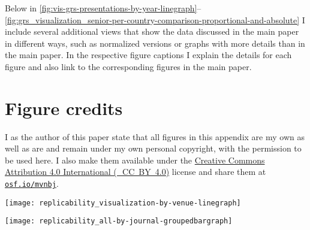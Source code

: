 \documentclass[conference,svgnames]{vgtc}                     %
\newcommand{\ie}{i.\,e.}
\newcommand{\osfid}{mvnbj}
\begin{document}
Below in \autoref{fig:vis-grs-presentations-by-year-linegraph}--\ref{fig:grs_visualization_senior-per-country-comparison-proportional-and-absolute} I include several additional views that show the data discussed in the main paper in different ways, such as normalized versions or graphs with more details than in the main paper. In the respective figure captions I explain the details for each figure and also link to the corresponding figures in the main paper.

\section*{Figure credits}
\label{sec:figure_credits_appx}

I as the author of this paper state that all figures in this appendix are my own as well as are and remain under my own personal copyright, with the permission to be used here. I also make them available under the \href{https://creativecommons.org/licenses/by/4.0/}{Creative Commons At\-tri\-bu\-tion 4.0 International (\ccLogo\,\ccAttribution\ \mbox{CC BY 4.0})} license and share them at \href{https://osf.io/\osfid/}{\texttt{osf.io/\osfid}}.

\begin{figure*}
	\centering
	\texttt{[image: replicability\_visualization-by-venue-linegraph]}
	\caption{Line graph version of \autoref{fig:teaser} (but without the stacking aspect of \autoref{fig:teaser}, so here I show one line for only the GRSI-awarded papers of the venue plus one line for all papers of a venue): Papers that can clearly be classified as visualization work (visualization conferences and special issues in journals) by \emph{presentation} year (\ie, based on the \emph{conference years}, in which the papers were presented) and their subset with GRS.\textsuperscript{\ref{foot:vis_presentations},\ref{foot:c-and-g-special}}}
	\label{fig:vis-grs-presentations-by-year-linegraph}
\end{figure*}

\begin{figure*}
	\centering
	\texttt{[image: replicability\_all-by-journal-groupedbargraph]}
	\caption{Bar chart version of \autoref{fig:grs-overall}: Overall development of papers with GRS, by publication venues (and their article \emph{publication} years).}
	\label{fig:grs-overall-bars}
\end{figure*}
\end{document}
